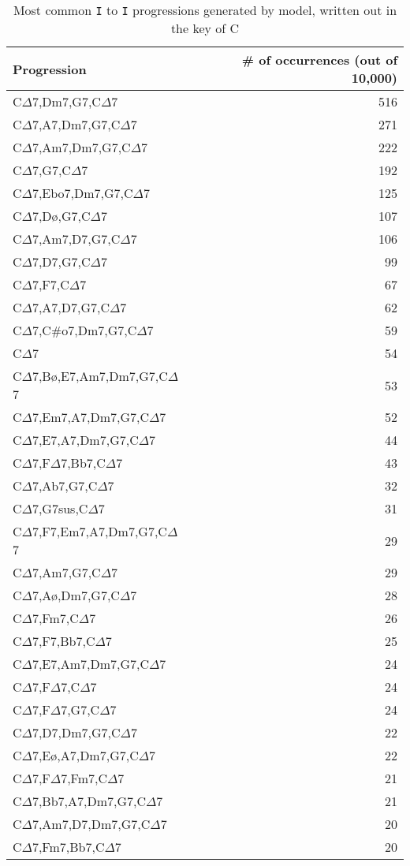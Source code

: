 \documentclass[]{article}
\begin{document}
\begin{table}
	\centering
	\caption{Most common \texttt{I} to \texttt{I} progressions generated by model, written out in the key of C}
	\label{fig:progressions}
	\begin{tabular}{l|r}
		Progression & \# of occurrences (out of 10,000) \\
		\hline
		C$\Delta$7,Dm7,G7,C$\Delta$7 & 516 \\
		C$\Delta$7,A7,Dm7,G7,C$\Delta$7 & 271 \\
		C$\Delta$7,Am7,Dm7,G7,C$\Delta$7 & 222 \\
		C$\Delta$7,G7,C$\Delta$7 & 192 \\
		C$\Delta$7,Ebo7,Dm7,G7,C$\Delta$7 & 125 \\
		C$\Delta$7,D\o,G7,C$\Delta$7 & 107 \\
		C$\Delta$7,Am7,D7,G7,C$\Delta$7 & 106 \\
		C$\Delta$7,D7,G7,C$\Delta$7 & 99 \\
		C$\Delta$7,F7,C$\Delta$7 & 67 \\
		C$\Delta$7,A7,D7,G7,C$\Delta$7 & 62 \\
		C$\Delta$7,C\#o7,Dm7,G7,C$\Delta$7 & 59 \\
		C$\Delta$7 & 54 \\
		C$\Delta$7,B\o,E7,Am7,Dm7,G7,C$\Delta$7 & 53 \\
		C$\Delta$7,Em7,A7,Dm7,G7,C$\Delta$7 & 52 \\
		C$\Delta$7,E7,A7,Dm7,G7,C$\Delta$7 & 44 \\
		C$\Delta$7,F$\Delta$7,Bb7,C$\Delta$7 & 43 \\
		C$\Delta$7,Ab7,G7,C$\Delta$7 & 32 \\
		C$\Delta$7,G7sus,C$\Delta$7 & 31 \\
		C$\Delta$7,F7,Em7,A7,Dm7,G7,C$\Delta$7 & 29 \\
		C$\Delta$7,Am7,G7,C$\Delta$7 & 29 \\
		C$\Delta$7,A\o,Dm7,G7,C$\Delta$7 & 28 \\
		C$\Delta$7,Fm7,C$\Delta$7 & 26 \\
		C$\Delta$7,F7,Bb7,C$\Delta$7 & 25 \\
		C$\Delta$7,E7,Am7,Dm7,G7,C$\Delta$7 & 24 \\
		C$\Delta$7,F$\Delta$7,C$\Delta$7 & 24 \\
		C$\Delta$7,F$\Delta$7,G7,C$\Delta$7 & 24 \\
		C$\Delta$7,D7,Dm7,G7,C$\Delta$7 & 22 \\
		C$\Delta$7,E\o,A7,Dm7,G7,C$\Delta$7 & 22 \\
		C$\Delta$7,F$\Delta$7,Fm7,C$\Delta$7 & 21 \\
		C$\Delta$7,Bb7,A7,Dm7,G7,C$\Delta$7 & 21 \\
		C$\Delta$7,Am7,D7,Dm7,G7,C$\Delta$7 & 20 \\
		C$\Delta$7,Fm7,Bb7,C$\Delta$7 & 20
	\end{tabular}
\end{table}
\end{document}
